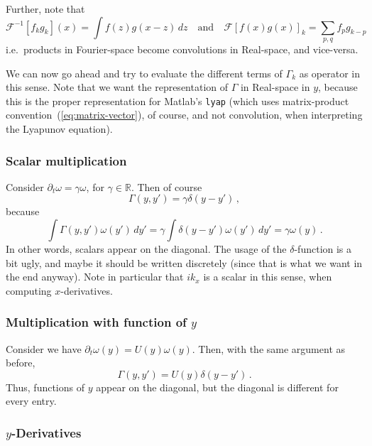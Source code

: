 \documentclass[11pt,reqno,a4paper]{amsart}
\newcommand{\RR}{\mathds{R}}
\theoremstyle{definition}
\begin{document}
Further, note that
\begin{equation}
  \label{eq:convolutions}
  \mathcal F^{-1} [f_k g_k](x) = \int f(z) g(x-z)\,dz\quad\text{and}\quad \mathcal F[f(x) g(x)]_k = \sum_{p,q} f_p g_{k-p}
\end{equation}
i.e.~products in Fourier-space become convolutions in Real-space, and
vice-versa.

We can now go ahead and try to evaluate the different terms of
$\Gamma_k$ as operator in this sense. Note that we want the
representation of $\Gamma$ in Real-space in $y$, because this is the
proper representation for Matlab's \texttt{lyap} (which uses
matrix-product convention~(\ref{eq:matrix-vector}), of course,
and not convolution, when interpreting the Lyapunov equation).

\subsubsection{Scalar multiplication}

Consider $\partial_t \omega = \gamma \omega$, for $\gamma \in
\RR$. Then of course
\begin{equation}
  \Gamma(y,y') = \gamma \delta(y-y')\,,
\end{equation}
because
\begin{equation}
  \int \Gamma(y,y') \omega(y')\,dy' = \gamma \int \delta(y-y')
  \omega(y')\,dy' = \gamma \omega(y)\,.
\end{equation}
In other words, scalars appear on the diagonal. The usage of the
$\delta$-function is a bit ugly, and maybe it should be written
discretely (since that is what we want in the end anyway). Note in
particular that $i k_x$ is a scalar in this sense, when computing
$x$-derivatives.

\subsubsection{Multiplication with function of $y$}

Consider we have $\partial_t \omega(y) = U(y) \omega(y)$. Then, with
the same argument as before,
\begin{equation}
  \Gamma(y,y') = U(y) \delta(y-y')\,.
\end{equation}
Thus, functions of $y$ appear on the diagonal, but the diagonal is
different for every entry.

\subsubsection{$y$-Derivatives}
\end{document}
